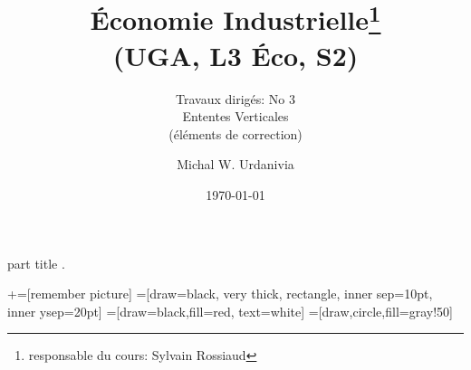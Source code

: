 
\usepackage{color}
\usepackage{tikz}
\usetikzlibrary{shapes.geometric, arrows}
\usepackage{enumerate}   
\usepackage{multirow}
%
  \usepackage{eso-pic}

{
    \begin{centering}
    \begin{beamercolorbox}[sep=11pt,center]{part title}
    \thesection.~\insertsection\par
    \end{beamercolorbox}
    \end{centering}
}
\title[]{ \textbf{Économie Industrielle}\footnote{responsable du cours: Sylvain Rossiaud} \\ (UGA, L3 Éco, S2) \\ }
\subtitle{Travaux dirigés: No 3\\ Ententes Verticales\\
(éléments de correction)}
\date{\today}
\author{Michal W. Urdanivia\inst{*}}




\usetikzlibrary{positioning}
\usetikzlibrary{snakes}
\usetikzlibrary{calc}
\usetikzlibrary{arrows}
\usetikzlibrary{decorations.markings}
\usetikzlibrary{shapes.misc}
\usetikzlibrary{matrix,shapes,arrows,fit,tikzmark}
\usetikzlibrary{shapes}
\usetikzlibrary{shapes.geometric, arrows}
\newcommand\marktopleft[1]{
    \tikz[overlay,remember picture] 
        \node (marker-#1-a) at (-.3em,.3em) {};%
}
\newcommand\markbottomright[2]{%
    \tikz[overlay,remember picture] 
        \node (marker-#1-b) at (0em,0em) {};%
}
+=[remember picture] 
 =[draw=black, very thick, rectangle, inner sep=10pt, inner ysep=20pt]
 =[draw=black,fill=red, text=white]
=[draw,circle,fill=gray!50]


